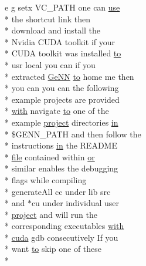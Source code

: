 \begin{DoxyCompactItemize}
e g setx V\+C\+\_\+\+P\+A\+T\+H one can \hyperlink{README_8txt_acf386c48a14a2099c9220d6bcde40fc8}{use} \\*
the shortcut link then \\*
download and install the \\*
Nvidia C\+U\+D\+A toolkit if your \\*
C\+U\+D\+A toolkit was installed \hyperlink{README_8txt_add1f2ee32acc15ef77f839d4382c9768}{to} \\*
usr local you can if you \\*
extracted \hyperlink{README_8txt_a431a8d9aae97c72793fee7c3edd68559}{Ge\+N\+N} \hyperlink{README_8txt_add1f2ee32acc15ef77f839d4382c9768}{to} home me then \\*
you can you can the following \\*
example projects are provided \\*
\hyperlink{userproject_2OneComp__project_2README_8txt_ace09bb40fbf4457ad9a9340a67a4fa9a}{with} navigate \hyperlink{README_8txt_add1f2ee32acc15ef77f839d4382c9768}{to} one of the \\*
example \hyperlink{userproject_2SynDelay__project_2README_8txt_a762c750134e07a31b7965860fd292b51}{project} directories \hyperlink{README_8txt_a148897a6b2cc9cff25af80abb13426b0}{in} \\*
\$G\+E\+N\+N\+\_\+\+P\+A\+T\+H and then follow the \\*
instructions \hyperlink{README_8txt_a148897a6b2cc9cff25af80abb13426b0}{in} the R\+E\+A\+D\+M\+E \\*
\hyperlink{README_8txt_a6f45b2930c1b79b67034355b4701dc56}{file} contained within \hyperlink{userproject_2PoissonIzh__project_2README_8txt_ad4021097ab0ba066271614bf3f4c2e27}{or} \\*
similar enables the debugging \\*
flags while compiling \\*
generate\+All cc under lib src \\*
and $\ast$cu under individual user \\*
\hyperlink{userproject_2SynDelay__project_2README_8txt_a762c750134e07a31b7965860fd292b51}{project} and will run the \\*
corresponding executables \hyperlink{userproject_2OneComp__project_2README_8txt_ace09bb40fbf4457ad9a9340a67a4fa9a}{with} \\*
\hyperlink{README_8txt_a386e5818501e36b046e9cf9ee9a1a6b0}{cuda} gdb consecutively If you \\*
want \hyperlink{README_8txt_add1f2ee32acc15ef77f839d4382c9768}{to} skip one of these \\*

\end{DoxyCompactItemize}
